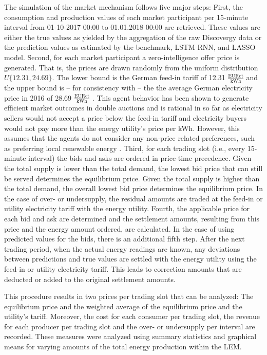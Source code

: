 The simulation of the market mechanism follows five major steps: First, the consumption and production values of each market participant per 15-minute interval from 01-10-2017 00:00 to 01.01.2018 00:00 are retrieved. These values are either the true values as yielded by the aggregation of the raw Discovergy data or the prediction values as estimated by the benchmark, LSTM RNN, and LASSO model. Second, for each market participant a zero-intelligence offer price is generated. That is, the prices are drawn randomly from the uniform distribution $\textit{U}\{12.31,24.69\}$. The lower bound is the German feed-in tariff of 12.31 $\frac{\text{EURct}}{\text{kWh}}$ and the upper bound is -- for consistency with \citet{Mengelkamp:2018a} -- the the average German electricity price in 2016 of 28.69 $\frac{\text{EURct}}{\text{kWh}}$ \citep{Heidjann:2017}. This agent behavior has been shown to generate efficient market outcomes in double auctions \citep{Gode:1993} and is rational in so far as electricity sellers would not accept a price below the feed-in tariff and electricity buyers would not pay more than the energy utility's price per kWh. However, this assumes that the agents do not consider any non-price related preferences, such as preferring local renewable energy \citep{Mengelkamp:2018a}. Third, for each trading slot (i.e., every 15-minute interval) the bids and asks are ordered in price-time precedence. Given the total supply is lower than the total demand, the lowest bid price that can still be served determines the equilibrium price. Given the total supply is higher than the total demand, the overall lowest bid price determines the equilibrium price. In the case of over- or undersupply, the residual amounts are traded at the feed-in or utility electricity tariff with the energy utility. Fourth, the applicable price for each bid and ask are determined and the settlement amounts, resulting from this price and the energy amount ordered, are calculated. In the case of using predicted values for the bids, there is an additional fifth step. After the next trading period, when the actual energy readings are known, any deviations between predictions and true values are settled with the energy utility using the feed-in or utility electricity tariff. This leads to correction amounts that are deducted or added to the original settlement amounts.

This procedure results in two prices per trading slot that can be analyzed: The equilibrium price and the weighted average of the equilibrium price and the utility's tariff. Moreover, the cost for each consumer per trading slot, the revenue for each producer per trading slot and the over- or undersupply per interval are recorded. These measures were analyzed using summary statistics and graphical means for varying amounts of the total energy production within the LEM.


